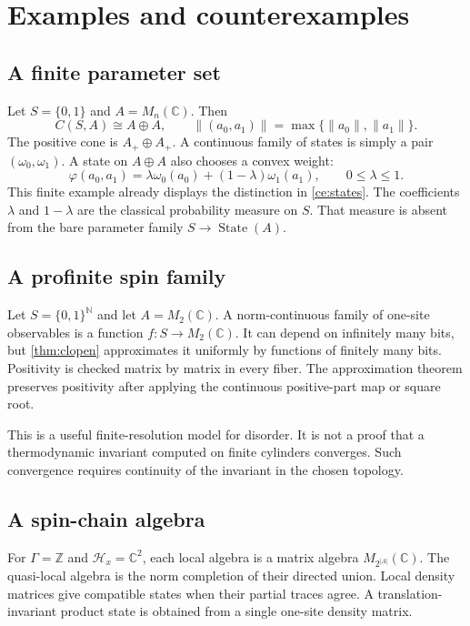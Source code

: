 \documentclass[12pt]{article}
\theoremstyle{definition}
\theoremstyle{remark}
\newcommand{\C}{\mathbb C}
\newcommand{\Z}{\mathbb Z}
\newcommand{\N}{\mathbb N}
\newcommand{\State}{\operatorname{State}}
\begin{document}
\section{Examples and counterexamples}

\subsection{A finite parameter set}

Let $S=\{0,1\}$ and $A=M_n(\C)$.  Then
\[
C(S,A)\cong A\oplus A,
\qquad
\|(a_0,a_1)\|=\max\{\|a_0\|,\|a_1\|\}.
\]
The positive cone is $A_+\oplus A_+$.  A continuous family of states is simply a
pair $(\omega_0,\omega_1)$.  A state on $A\oplus A$ also chooses a convex weight:
\[
\varphi(a_0,a_1)
=
\lambda\omega_0(a_0)+(1-\lambda)\omega_1(a_1),
\qquad 0\leq\lambda\leq1.
\]
This finite example already displays the distinction in \cref{ce:states}.
The coefficients $\lambda$ and $1-\lambda$ are the classical probability measure on
$S$.  That measure is absent from the bare parameter family $S\to\State(A)$.

\subsection{A profinite spin family}

Let $S=\{0,1\}^{\N}$ and let $A=M_2(\C)$.  A norm-continuous family of one-site
observables is a function $f:S\to M_2(\C)$.  It can depend on infinitely many bits,
but \cref{thm:clopen} approximates it uniformly by functions of finitely many bits.
Positivity is checked matrix by matrix in every fiber.  The approximation theorem
preserves positivity after applying the continuous positive-part map or square root.

This is a useful finite-resolution model for disorder.  It is not a proof that a
thermodynamic invariant computed on finite cylinders converges.  Such convergence
requires continuity of the invariant in the chosen topology.

\subsection{A spin-chain algebra}

For $\Gamma=\Z$ and $\mathcal H_x=\C^2$, each local algebra is a matrix algebra
$M_{2^{|\Lambda|}}(\C)$.  The quasi-local algebra is the norm completion of their
directed union.  Local density matrices give compatible states when their partial
traces agree.  A translation-invariant product state is obtained from a single
one-site density matrix.
\end{document}
